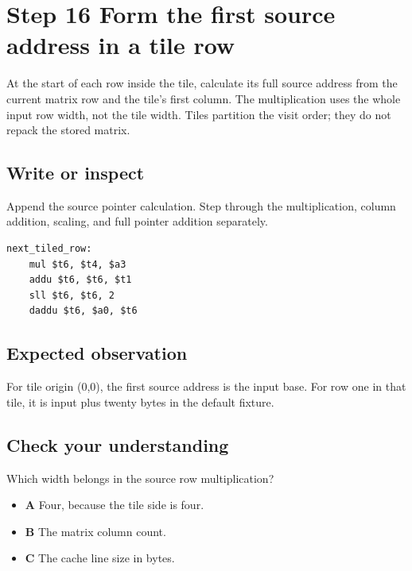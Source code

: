 \section{Step 16 Form the first source address in a tile row}\label{transpose-s16}

At the start of each row inside the tile, calculate its full source address from the current matrix row and the tile's first column. The multiplication uses the whole input row width, not the tile width. Tiles partition the visit order; they do not repack the stored matrix.

\subsection{Write or inspect}
Append the source pointer calculation. Step through the multiplication, column addition, scaling, and full pointer addition separately.

\begin{verbatim}
next_tiled_row:
    mul $t6, $t4, $a3
    addu $t6, $t6, $t1
    sll $t6, $t6, 2
    daddu $t6, $a0, $t6
\end{verbatim}

\subsection{Expected observation}
For tile origin (0,0), the first source address is the input base. For row one in that tile, it is input plus twenty bytes in the default fixture.

\subsection{Check your understanding}
Which width belongs in the source row multiplication?

\begin{itemize}
  \item \textbf{A} Four, because the tile side is four.
  \item \textbf{B} The matrix column count.
  \item \textbf{C} The cache line size in bytes.
\end{itemize}

